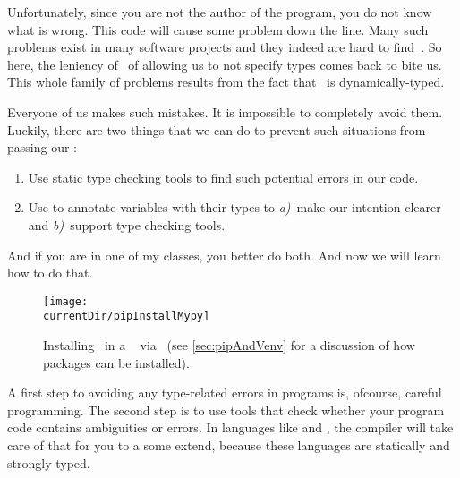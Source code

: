 Unfortunately, since you are not the author of the program, you do not know what is wrong.
This code will cause some problem down the line.
Many such problems exist in many software projects and they indeed are hard to find~\cite{KCVM2022AESOTRDIPP}.
So here, the leniency of \python\ of allowing us to not specify types comes back to bite us.
This whole family of problems results from the fact that \python\ is dynamically-typed.

Everyone of us makes such mistakes.
It is impossible to completely avoid them.
Luckily, there are two things that we can do to prevent such situations from passing our :%
%
\begin{enumerate}%
%
\item Use static type checking tools to find such potential errors in our code.%
%
\item Use  to annotate variables with their types to \emph{a)}~make our intention clearer and \emph{b)}~support type checking tools.%
%
\end{enumerate}%
%
And if you are in one of my classes, you better do both.
And now we will learn how to do that.%
\endhsection%
%
%
%
%
\begin{figure}%
\centering%
\texttt{[image: \\currentDir/pipInstallMypy]}%
\caption{Installing \mypy\ in a \ubuntu\  via \pip~(see \cref{sec:pipAndVenv} for a discussion of how packages can be installed).}%
\label{fig:pipInstallMypy}%
\end{figure}%
%
%
%
%
%
%
%
A first step to avoiding any type-related errors in programs is, ofcourse, careful programming.
The second step is to use tools that check whether your program code contains ambiguities or errors.
In languages like  and , the compiler will take care of that for you to a some extend, because these languages are statically and strongly typed.

